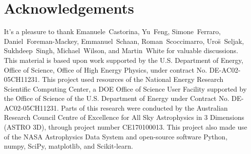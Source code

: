 \documentclass[12pt, letterpaper, preprint]{aastex6}
\begin{document}
\section*{Acknowledgements}
It's a pleasure to thank 
    Emanuele~Castorina,
    Yu~Feng, 
    Simone~Ferraro,
    Daniel~Foreman-Mackey, 
    Emmanuel~Schaan, 
    Roman~Scoccimarro,
    Uro{\u s}~Seljak,
    Sukhdeep~Singh, 
    Michael~Wilson, 
    and Martin~White
for valuable discussions.
This material is based upon work supported by the U.S. Department 
of Energy, Office of Science, Office of High Energy Physics, under 
contract No. DE-AC02-05CH11231.
This project used resources of the National Energy Research 
Scientific Computing Center, a DOE Office of Science User 
Facility supported by the Office of Science of the U.S. 
Department of Energy under Contract No. DE-AC02-05CH11231.
Parts of this research were conducted by the Australian Research Council
Centre of Excellence for All Sky Astrophysics in 3 Dimensions (ASTRO 3D),
through project number CE170100013.
This project also made use of the NASA Astrophysics Data 
System and open-source software Python, numpy, SciPy, matplotlib, 
and Scikit-learn. 



\end{document}

